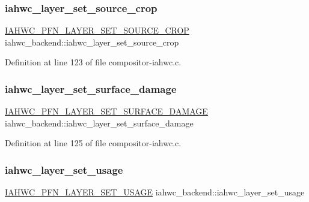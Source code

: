 \subsubsection{\texorpdfstring{iahwc\+\_\+layer\+\_\+set\+\_\+source\+\_\+crop}{iahwc\_layer\_set\_source\_crop}}
{\footnotesize\ttfamily \mbox{\hyperlink{iahwc_8h_ac7b199c17ecff5d053dfdfae361b1bbe}{I\+A\+H\+W\+C\+\_\+\+P\+F\+N\+\_\+\+L\+A\+Y\+E\+R\+\_\+\+S\+E\+T\+\_\+\+S\+O\+U\+R\+C\+E\+\_\+\+C\+R\+OP}} iahwc\+\_\+backend\+::iahwc\+\_\+layer\+\_\+set\+\_\+source\+\_\+crop}



Definition at line 123 of file compositor-\/iahwc.\+c.

\mbox{\label{structiahwc__backend_aaf78efc58c573fe0d579f7e94cdf6c1f}} 
\subsubsection{\texorpdfstring{iahwc\+\_\+layer\+\_\+set\+\_\+surface\+\_\+damage}{iahwc\_layer\_set\_surface\_damage}}
{\footnotesize\ttfamily \mbox{\hyperlink{iahwc_8h_adcfd825452e18516d0fa2e4ff3925c93}{I\+A\+H\+W\+C\+\_\+\+P\+F\+N\+\_\+\+L\+A\+Y\+E\+R\+\_\+\+S\+E\+T\+\_\+\+S\+U\+R\+F\+A\+C\+E\+\_\+\+D\+A\+M\+A\+GE}} iahwc\+\_\+backend\+::iahwc\+\_\+layer\+\_\+set\+\_\+surface\+\_\+damage}



Definition at line 125 of file compositor-\/iahwc.\+c.

\mbox{\label{structiahwc__backend_afc0aa0cbc9e636caa6c64f6b3e625e72}} 
\subsubsection{\texorpdfstring{iahwc\+\_\+layer\+\_\+set\+\_\+usage}{iahwc\_layer\_set\_usage}}
{\footnotesize\ttfamily \mbox{\hyperlink{iahwc_8h_a956199a9af0a303b122e92efc7b59538}{I\+A\+H\+W\+C\+\_\+\+P\+F\+N\+\_\+\+L\+A\+Y\+E\+R\+\_\+\+S\+E\+T\+\_\+\+U\+S\+A\+GE}} iahwc\+\_\+backend\+::iahwc\+\_\+layer\+\_\+set\+\_\+usage}




